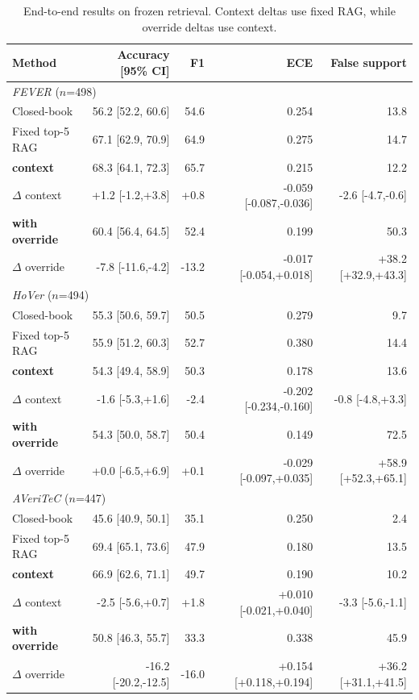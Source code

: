 \begin{table}[t]
\centering\footnotesize\setlength{\tabcolsep}{4pt}
\renewcommand{\arraystretch}{0.93}
\captionsetup{skip=4pt}
\caption{End-to-end results on frozen retrieval. Context deltas use fixed RAG, while override deltas use context.}
\label{tab:benchmarks}
\begin{tabular*}{0.86\textwidth}{@{\extracolsep{\fill}}lrrrr}
\toprule
Method & Accuracy [95\% CI] & F1 & ECE & False support \\
\midrule
\multicolumn{5}{l}{\emph{FEVER} ($n$=498)} \\
Closed-book & 56.2 [52.2, 60.6] & 54.6 & 0.254 & 13.8 \\
Fixed top-5 RAG & 67.1 [62.9, 70.9] & 64.9 & 0.275 & 14.7 \\
\textbf{\system{} context} & 68.3 [64.1, 72.3] & 65.7 & 0.215 & 12.2 \\
\quad $\Delta$ context & +1.2 [-1.2,+3.8] & +0.8 & -0.059 [-0.087,-0.036] & -2.6 [-4.7,-0.6] \\
\textbf{\system{} with override} & 60.4 [56.4, 64.5] & 52.4 & 0.199 & 50.3 \\
\quad $\Delta$ override & -7.8 [-11.6,-4.2] & -13.2 & -0.017 [-0.054,+0.018] & +38.2 [+32.9,+43.3] \\
\midrule
\multicolumn{5}{l}{\emph{HoVer} ($n$=494)} \\
Closed-book & 55.3 [50.6, 59.7] & 50.5 & 0.279 & 9.7 \\
Fixed top-5 RAG & 55.9 [51.2, 60.3] & 52.7 & 0.380 & 14.4 \\
\textbf{\system{} context} & 54.3 [49.4, 58.9] & 50.3 & 0.178 & 13.6 \\
\quad $\Delta$ context & -1.6 [-5.3,+1.6] & -2.4 & -0.202 [-0.234,-0.160] & -0.8 [-4.8,+3.3] \\
\textbf{\system{} with override} & 54.3 [50.0, 58.7] & 50.4 & 0.149 & 72.5 \\
\quad $\Delta$ override & +0.0 [-6.5,+6.9] & +0.1 & -0.029 [-0.097,+0.035] & +58.9 [+52.3,+65.1] \\
\midrule
\multicolumn{5}{l}{\emph{AVeriTeC} ($n$=447)} \\
Closed-book & 45.6 [40.9, 50.1] & 35.1 & 0.250 & 2.4 \\
Fixed top-5 RAG & 69.4 [65.1, 73.6] & 47.9 & 0.180 & 13.5 \\
\textbf{\system{} context} & 66.9 [62.6, 71.1] & 49.7 & 0.190 & 10.2 \\
\quad $\Delta$ context & -2.5 [-5.6,+0.7] & +1.8 & +0.010 [-0.021,+0.040] & -3.3 [-5.6,-1.1] \\
\textbf{\system{} with override} & 50.8 [46.3, 55.7] & 33.3 & 0.338 & 45.9 \\
\quad $\Delta$ override & -16.2 [-20.2,-12.5] & -16.0 & +0.154 [+0.118,+0.194] & +36.2 [+31.1,+41.5] \\
\bottomrule
\end{tabular*}
\end{table}
